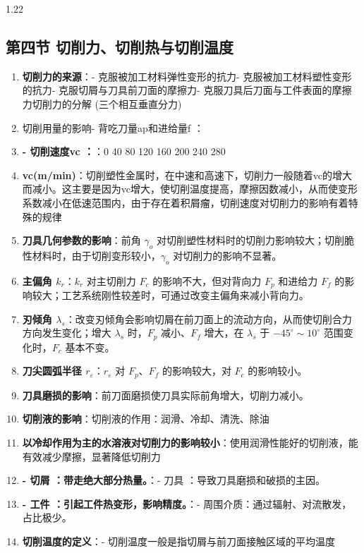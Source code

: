 \documentclass[12pt,a4paper]{article}
\begin{document}
\begin{spacing}{1.22}
\subsection{第四节 切削力、切削热与切削温度}
\begin{tcolorbox}[colback=yellow!6,colframe=red!55!black,title=重点,left=1mm,right=1mm]
\begin{enumerate}[leftmargin=2.2em,label=\arabic*.]
  \item \textbf{切削力的来源}：- 克服被加工材料弹性变形的抗力- 克服被加工材料塑性变形的抗力- 克服切屑与刀具前刀面的摩擦力- 克服刀具后刀面与工件表面的摩擦力切削力的分解 (三个相互垂直分力)
  \item 切削用量的影响- 背吃刀量ap和进给量f ：
  \item \textbf{- 切削速度vc ：}：0 40 80 120 160 200 240 280
  \item \textbf{vc(m/min)}：切削塑性金属时，在中速和高速下，切削力一般随着vc的增大而减小。这主要是因为vc增大，使切削温度提高，摩擦因数减小，从而使变形系数减小在低速范围内，由于存在着积屑瘤，切削速度对切削力的影响有着特殊的规律
  \item \textbf{刀具几何参数的影响}：前角 $\gamma_o$ 对切削塑性材料时的切削力影响较大；切削脆性材料时，由于切削变形较小，$\gamma_o$ 对切削力的影响不显著。
  \item \textbf{主偏角 $k_r$}：$k_r$ 对主切削力 $F_c$ 的影响不大，但对背向力 $F_p$ 和进给力 $F_f$ 的影响较大；工艺系统刚性较差时，可通过改变主偏角来减小背向力。
  \item \textbf{刃倾角 $\lambda_s$}：改变刃倾角会影响切屑在前刀面上的流动方向，从而使切削合力方向发生变化；增大 $\lambda_s$ 时，$F_p$ 减小、$F_f$ 增大，在 $\lambda_s$ 于 $-45^\circ\sim10^\circ$ 范围变化时，$F_c$ 基本不变。
  \item \textbf{刀尖圆弧半径 $r_\varepsilon$}：$r_\varepsilon$ 对 $F_p$、$F_f$ 的影响较大，对 $F_c$ 的影响较小。
  \item \textbf{刀具磨损的影响}：前刀面磨损使刀具实际前角增大，切削力减小。
  \item \textbf{切削液的影响}：切削液的作用：润滑、冷却、清洗、除油
  \item \textbf{以冷却作用为主的水溶液对切削力的影响较小}：使用润滑性能好的切削液，能有效减少摩擦，显著降低切削力
  \item \textbf{- 切屑 ：带走绝大部分热量。}：- 刀具 ：导致刀具磨损和破损的主因。
  \item \textbf{- 工件 ：引起工件热变形，影响精度。}：- 周围介质：通过辐射、对流散发，占比极少。
  \item \textbf{切削温度的定义}：- 切削温度一般是指切屑与前刀面接触区域的平均温度

\end{enumerate}
\end{tcolorbox}
\end{spacing}
\end{document}
